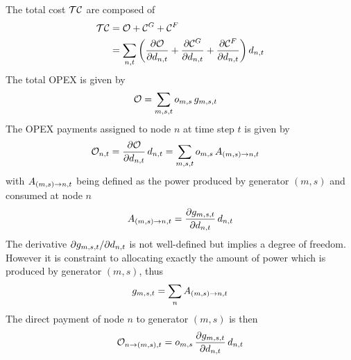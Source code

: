 \documentclass[a4paper,10pt]{article}
\begin{document}
The total cost $\totalcost$ are composed of
\begin{align}
\totalcost &= \totalOpexGeneration + \totalCapexGeneration +  \totalCapexFlow  \\
&= \sum_{n,t} \left(  \pdv{\totalOpexGeneration}{\nodaldemand} + \pdv{\totalCapexGeneration}{\nodaldemand} + \pdv{\totalCapexFlow}{\nodaldemand} \right) \nodaldemand 
\label{eq:total_cost_terms}
\end{align}
% 
The total OPEX is given by 
\begin{align}
 \totalOpexGeneration& = \sum_{m,s,t} \opexGeneration[m]\,  \generation[m] 
\end{align}
% 
The OPEX payments assigned to node $n$ at time step $t$ is given by 
% 
\begin{align}
\allocateOpex  = \pdv{\totalOpexGeneration}{\nodaldemand} \, \nodaldemand & =  \sum_{m,s,t}\opexGeneration[m] \,  \allocatePeer
\end{align}
% 
with $\allocatePeer$ being defined as the power produced by generator $(m, s)$ and consumed at node $n$
\begin{align}
 \allocatePeer = \pdv{\generation[m]}{\nodaldemand} \, \nodaldemand
\end{align}
% 
The derivative $\partial \generation[m] / \partial \nodaldemand$ is not well-defined but implies a degree of freedom. However it is constraint to allocating exactly the amount of power which is produced by generator $(m,s)$, thus 
\begin{align}
\generation[m] = \sum_n \allocatePeer 
\label{eq:solution_space_slack}
\end{align}
% 
The direct payment of node $n$ to generator $(m,s)$ is then  
% 
\begin{align}
 \allocateOpex[n \rightarrow (m,s)] &= 
\opexGeneration[m] \,  \pdv{\generation[m]}{\nodaldemand} \, \nodaldemand
\label{eq:allocate_opexGeneration_detailed}\\
\end{align}





\end{document}
